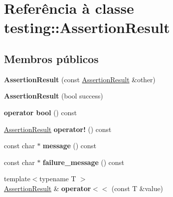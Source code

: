 \hypertarget{classtesting_1_1AssertionResult}{\section{Referência à classe testing\-:\-:Assertion\-Result}
\label{classtesting_1_1AssertionResult}
}
\subsection*{Membros públicos}
\begin{DoxyCompactItemize}
\item 
\hypertarget{classtesting_1_1AssertionResult_a27788116f03f90aec4daf592fd809ead}{{\bfseries Assertion\-Result} (const \hyperlink{classtesting_1_1AssertionResult}{Assertion\-Result} \&other)}\label{classtesting_1_1AssertionResult_a27788116f03f90aec4daf592fd809ead}

\item 
\hypertarget{classtesting_1_1AssertionResult_ade695178c05c4b2f82e92930c912fc25}{{\bfseries Assertion\-Result} (bool success)}\label{classtesting_1_1AssertionResult_ade695178c05c4b2f82e92930c912fc25}

\item 
\hypertarget{classtesting_1_1AssertionResult_af85b7852e6399467cd74df539810abcd}{{\bfseries operator bool} () const }\label{classtesting_1_1AssertionResult_af85b7852e6399467cd74df539810abcd}

\item 
\hypertarget{classtesting_1_1AssertionResult_a85301ba52aa1efe89b79d1e3b59160cd}{\hyperlink{classtesting_1_1AssertionResult}{Assertion\-Result} {\bfseries operator!} () const }\label{classtesting_1_1AssertionResult_a85301ba52aa1efe89b79d1e3b59160cd}

\item 
\hypertarget{classtesting_1_1AssertionResult_ab20c91eba13e20f1b4ad89e3d15f69a8}{const char $\ast$ {\bfseries message} () const }\label{classtesting_1_1AssertionResult_ab20c91eba13e20f1b4ad89e3d15f69a8}

\item 
\hypertarget{classtesting_1_1AssertionResult_ae54fa82506c507a9dbc0f85d2cec652a}{const char $\ast$ {\bfseries failure\-\_\-message} () const }\label{classtesting_1_1AssertionResult_ae54fa82506c507a9dbc0f85d2cec652a}

\item 
\hypertarget{classtesting_1_1AssertionResult_a3230efa81aafe7c61f5fb878cfa39e91}{{\footnotesize template$<$typename T $>$ }\\\hyperlink{classtesting_1_1AssertionResult}{Assertion\-Result} \& {\bfseries operator$<$$<$} (const T \&value)}\label{classtesting_1_1AssertionResult_a3230efa81aafe7c61f5fb878cfa39e91}


\end{DoxyCompactItemize}
